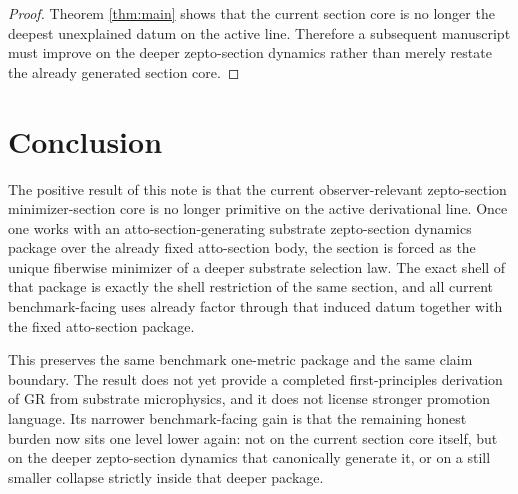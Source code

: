 \documentclass[11pt]{article}
\begin{document}
\begin{proof}
Theorem \ref{thm:main} shows that the current section core is no longer the deepest unexplained datum on the active line. Therefore a subsequent manuscript must improve on the deeper zepto-section dynamics rather than merely restate the already generated section core.
\end{proof}

\section{Conclusion}

The positive result of this note is that the current observer-relevant zepto-section minimizer-section core is no longer primitive on the active derivational line. Once one works with an atto-section-generating substrate zepto-section dynamics package over the already fixed atto-section body, the section is forced as the unique fiberwise minimizer of a deeper substrate selection law. The exact shell of that package is exactly the shell restriction of the same section, and all current benchmark-facing uses already factor through that induced datum together with the fixed atto-section package.

This preserves the same benchmark one-metric package and the same claim boundary. The result does not yet provide a completed first-principles derivation of GR from substrate microphysics, and it does not license stronger promotion language. Its narrower benchmark-facing gain is that the remaining honest burden now sits one level lower again: not on the current section core itself, but on the deeper zepto-section dynamics that canonically generate it, or on a still smaller collapse strictly inside that deeper package.
\end{document}
